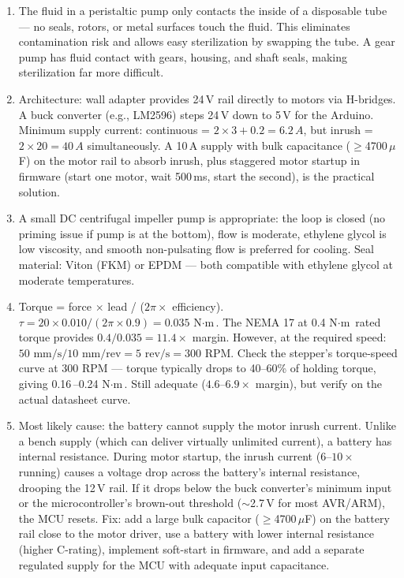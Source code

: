 \documentclass[11pt,letterpaper,twoside,openany]{book}
\begin{document}
\begin{enumerate}[leftmargin=1.5em]
  \item The fluid in a peristaltic pump only contacts the inside of a disposable tube --- no seals, rotors, or metal surfaces touch the fluid. This eliminates contamination risk and allows easy sterilization by swapping the tube. A gear pump has fluid contact with gears, housing, and shaft seals, making sterilization far more difficult.

  \item Architecture: wall adapter provides 24\,V rail directly to motors via H-bridges. A buck converter (e.g., LM2596) steps 24\,V down to 5\,V for the Arduino. Minimum supply current: continuous = $2 \times 3 + 0.2 = 6.2\,A$, but inrush = $2 \times 20 = 40\,A$ simultaneously. A 10\,A supply with bulk capacitance ($\geq$4700\,$\mu$F) on the motor rail to absorb inrush, plus staggered motor startup in firmware (start one motor, wait 500\,ms, start the second), is the practical solution.

  \item A small DC centrifugal impeller pump is appropriate: the loop is closed (no priming issue if pump is at the bottom), flow is moderate, ethylene glycol is low viscosity, and smooth non-pulsating flow is preferred for cooling. Seal material: Viton (FKM) or EPDM --- both compatible with ethylene glycol at moderate temperatures.

  \item Torque = force $\times$ lead / ($2\pi \times$ efficiency). $\tau = 20 \times 0.010 / (2\pi \times 0.9) = 0.035\,\ensuremath{\text{N}\cdot\text{m}}$. The NEMA 17 at 0.4\,\ensuremath{\text{N}\cdot\text{m}} rated torque provides $0.4 / 0.035 = 11.4\times$ margin. However, at the required speed: $50\text{ mm/s} / 10\text{ mm/rev} = 5\text{ rev/s} = 300\text{ RPM}$. Check the stepper's torque-speed curve at 300 RPM --- torque typically drops to 40--60\% of holding torque, giving 0.16\,--0.24\,\ensuremath{\text{N}\cdot\text{m}}. Still adequate ($4.6$--$6.9\times$ margin), but verify on the actual datasheet curve.

  \item Most likely cause: the battery cannot supply the motor inrush current. Unlike a bench supply (which can deliver virtually unlimited current), a battery has internal resistance. During motor startup, the inrush current ($6$--$10\times$ running) causes a voltage drop across the battery's internal resistance, drooping the 12\,V rail. If it drops below the buck converter's minimum input or the microcontroller's brown-out threshold ($\sim$2.7\,V for most AVR/ARM), the MCU resets. Fix: add a large bulk capacitor ($\geq$4700\,$\mu$F) on the battery rail close to the motor driver, use a battery with lower internal resistance (higher C-rating), implement soft-start in firmware, and add a separate regulated supply for the MCU with adequate input capacitance.
\end{enumerate}
\end{document}
